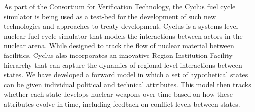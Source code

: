 As part of the Consortium for Verification Technology, the Cyclus fuel cycle simulator is being used as a test-bed for the development of such new technologies and approaches to treaty development. Cyclus is a systems-level nuclear fuel cycle simulator that models the interactions between actors in the nuclear arena\cite{cyclus_v1_5, huff_open_2011, huff_fundamental_2016}. While designed to track the flow of nuclear material between facilities, Cyclus also incorporates an innovative Region-Institution-Facility hierarchy that can capture the dynamics of regional-level interactions between states.  We have developed a forward model in which a set of hypothetical states can be given individual political and technical attributes. This model then tracks whether each state develops nuclear weapons over time based on how these attributes evolve in time, including feedback on conflict levels between states.

